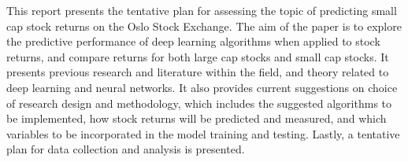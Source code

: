 This report presents the tentative plan for assessing the topic of predicting small cap stock returns on the Oslo Stock Exchange. The aim of the paper is to explore the predictive performance of deep learning algorithms when applied to stock returns, and compare returns for both large cap stocks and small cap stocks. It presents previous research and literature within the field, and theory related to deep learning and neural networks. It also provides current suggestions on choice of research design and methodology, which includes the suggested algorithms to be implemented, how stock returns will be predicted and measured, and which variables to be incorporated in the model training and testing. Lastly, a tentative plan for data collection and analysis is presented. 